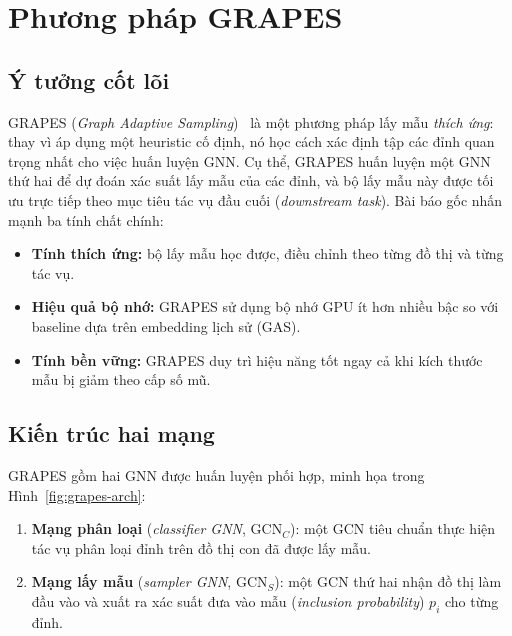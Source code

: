 \chapter{Phương pháp GRAPES}

\section{Ý tưởng cốt lõi}

GRAPES (\textit{Graph Adaptive Sampling})~\cite{Younesian2023GRAPES} là một phương pháp lấy mẫu \textit{thích ứng}: thay vì áp dụng một heuristic cố định, nó học cách xác định tập các đỉnh quan trọng nhất cho việc huấn luyện GNN. Cụ thể, GRAPES huấn luyện một GNN thứ hai để dự đoán xác suất lấy mẫu của các đỉnh, và bộ lấy mẫu này được tối ưu trực tiếp theo mục tiêu tác vụ đầu cuối (\textit{downstream task}). Bài báo gốc nhấn mạnh ba tính chất chính:
\begin{itemize}
    \item \textbf{Tính thích ứng:} bộ lấy mẫu học được, điều chỉnh theo từng đồ thị và từng tác vụ.
    \item \textbf{Hiệu quả bộ nhớ:} GRAPES sử dụng bộ nhớ GPU ít hơn nhiều bậc so với baseline dựa trên embedding lịch sử (GAS).
    \item \textbf{Tính bền vững:} GRAPES duy trì hiệu năng tốt ngay cả khi kích thước mẫu bị giảm theo cấp số mũ.
\end{itemize}

\section{Kiến trúc hai mạng}

GRAPES gồm hai GNN được huấn luyện phối hợp, minh họa trong Hình~\ref{fig:grapes-arch}:
\begin{enumerate}
    \item \textbf{Mạng phân loại} (\textit{classifier GNN}, $\text{GCN}_C$): một GCN tiêu chuẩn thực hiện tác vụ phân loại đỉnh trên đồ thị con đã được lấy mẫu.
    \item \textbf{Mạng lấy mẫu} (\textit{sampler GNN}, $\text{GCN}_S$): một GCN thứ hai nhận đồ thị làm đầu vào và xuất ra xác suất đưa vào mẫu (\textit{inclusion probability}) $p_i$ cho từng đỉnh.
\end{enumerate}

